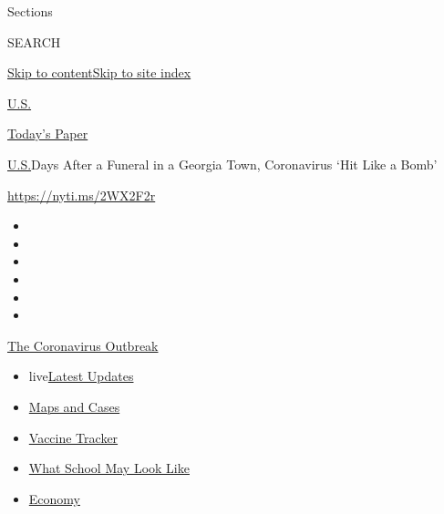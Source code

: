 Sections

SEARCH

\protect\hyperlink{site-content}{Skip to
content}\protect\hyperlink{site-index}{Skip to site index}

\href{https://www.nytimes.com/section/us}{U.S.}

\href{https://myaccount.nytimes.com/auth/login?response_type=cookie\&client_id=vi}{}

\href{https://www.nytimes.com/section/todayspaper}{Today's Paper}

\href{/section/us}{U.S.}\textbar{}Days After a Funeral in a Georgia
Town, Coronavirus `Hit Like a Bomb'

\url{https://nyti.ms/2WX2F2r}

\begin{itemize}
\item
\item
\item
\item
\item
\item
\end{itemize}

\href{https://www.nytimes.com/news-event/coronavirus?action=click\&pgtype=Article\&state=default\&region=TOP_BANNER\&context=storylines_menu}{The
Coronavirus Outbreak}

\begin{itemize}
\tightlist
\item
  live\href{https://www.nytimes.com/2020/08/02/world/coronavirus-updates.html?action=click\&pgtype=Article\&state=default\&region=TOP_BANNER\&context=storylines_menu}{Latest
  Updates}
\item
  \href{https://www.nytimes.com/interactive/2020/us/coronavirus-us-cases.html?action=click\&pgtype=Article\&state=default\&region=TOP_BANNER\&context=storylines_menu}{Maps
  and Cases}
\item
  \href{https://www.nytimes.com/interactive/2020/science/coronavirus-vaccine-tracker.html?action=click\&pgtype=Article\&state=default\&region=TOP_BANNER\&context=storylines_menu}{Vaccine
  Tracker}
\item
  \href{https://www.nytimes.com/interactive/2020/07/29/us/schools-reopening-coronavirus.html?action=click\&pgtype=Article\&state=default\&region=TOP_BANNER\&context=storylines_menu}{What
  School May Look Like}
\item
  \href{https://www.nytimes.com/live/2020/07/31/business/stock-market-today-coronavirus?action=click\&pgtype=Article\&state=default\&region=TOP_BANNER\&context=storylines_menu}{Economy}
\end{itemize}

